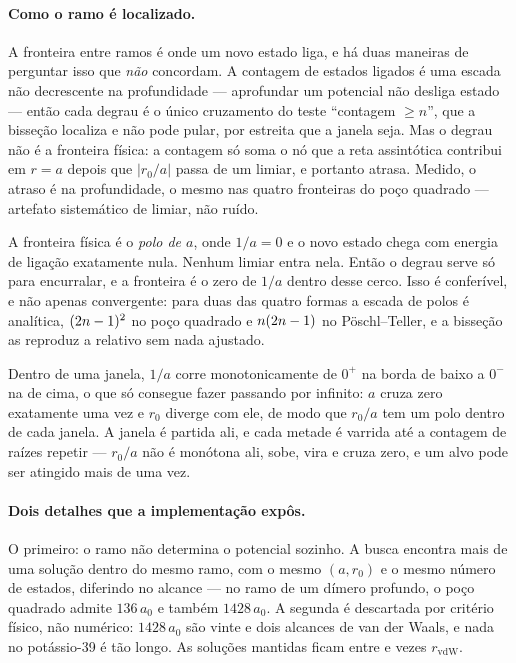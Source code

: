 \documentclass[11pt,a4paper]{article}
\begin{document}
\paragraph{Como o ramo é localizado.} A fronteira entre ramos é onde um novo
estado liga, e há duas maneiras de perguntar isso que \emph{não} concordam. A
contagem de estados ligados é uma escada não decrescente na profundidade ---
aprofundar um potencial não desliga estado --- então cada degrau é o único
cruzamento do teste ``contagem $\geq n$'', que a bisseção localiza e não pode
pular, por estreita que a janela seja. Mas o degrau não é a fronteira física: a
contagem só soma o nó que a reta assintótica contribui em $r=a$ depois que
$|r_0/a|$ passa de um limiar, e portanto atrasa. Medido, o atraso é
\EtrychEscadaAtraso{} na profundidade, o mesmo nas quatro fronteiras do poço
quadrado --- artefato sistemático de limiar, não ruído.

A fronteira física é o \emph{polo de $a$}, onde $1/a=0$ e o novo estado chega
com energia de ligação exatamente nula. Nenhum limiar entra nela. Então o degrau
serve só para encurralar, e a fronteira é o zero de $1/a$ dentro desse cerco.
Isso é conferível, e não apenas convergente: para duas das quatro formas a
escada de polos é analítica, $(2n-1)^2{}$ no poço quadrado e
$n(2n-1){}$ no Pöschl--Teller, e a bisseção as reproduz a
\EtrychEscadaErro{} relativo sem nada ajustado.

Dentro de uma janela, $1/a$ corre monotonicamente de $0^+$ na borda de baixo a
$0^-$ na de cima, o que só consegue fazer passando por infinito: $a$ cruza zero
exatamente uma vez e $r_0$ diverge com ele, de modo que $r_0/a$ tem um polo
dentro de cada janela. A janela é partida ali, e cada metade é varrida até a
contagem de raízes repetir --- $r_0/a$ não é monótona ali, sobe, vira e cruza
zero, e um alvo pode ser atingido mais de uma vez.

\paragraph{Dois detalhes que a implementação expôs.} O primeiro: o ramo não
determina o potencial sozinho. A busca encontra mais de uma solução dentro do
mesmo ramo, com o mesmo $(a,r_0)$ e o mesmo número de estados, diferindo no
alcance --- no ramo de um dímero profundo, o poço quadrado admite $136\,a_0$ e
também $1428\,a_0$. A segunda é descartada por critério físico, não numérico:
$1428\,a_0$ são vinte e dois alcances de van der Waals, e nada no potássio-39
é tão longo. As soluções mantidas ficam entre \EtrychRamoAlcanceBaixo{} e
\EtrychRamoAlcanceAlto{} vezes $r_\mathrm{vdW}$.
\end{document}

